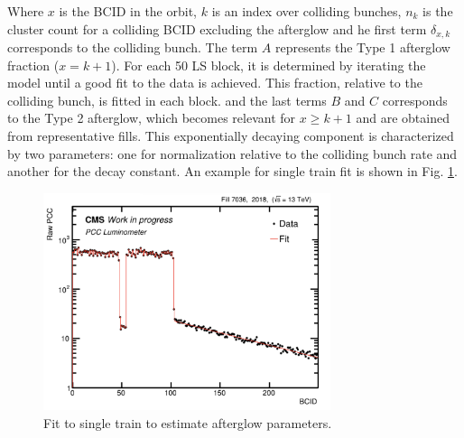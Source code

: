 Where $x$ is the BCID in the orbit, $k$ is an index over colliding bunches, $n_k$ is the cluster count for a colliding BCID excluding the afterglow and he first term $\delta_{x,k}$ corresponds to the colliding bunch. 
The term $A$ represents the Type 1 afterglow fraction (\( x = k+1 \)). For each 50 LS block, it is determined by iterating the model until a good fit to the data is achieved. This fraction, relative to the colliding bunch, is fitted in each block. 
and the last terms $B$ and $C$ corresponds to the Type 2 afterglow, which becomes relevant for $x\geq k+1$ and  are obtained from representative fills. This exponentially decaying component is characterized by two parameters: one for normalization relative to the colliding bunch rate and another for the decay constant. An example  for single train fit is shown in Fig. \ref{fig:af_fit99}. 

\begin{figure}
  \centering
    \includegraphics[width=0.75\textwidth]{figures/2018_af_fit_1.png} 
  \caption[Afterglow effect fit]{Fit to single train to estimate afterglow parameters.}
  \label{fig:af_fit99}
\end{figure}

